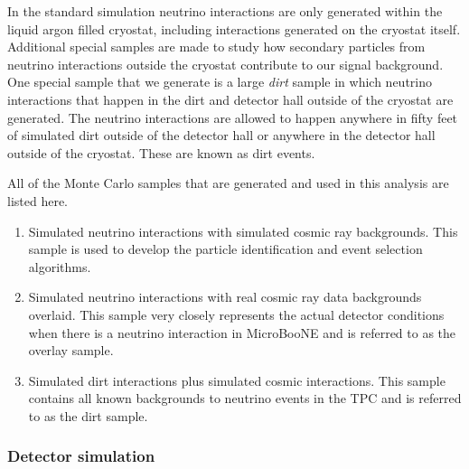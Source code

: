     In the standard simulation neutrino interactions are only generated within
    the liquid argon filled cryostat, including interactions generated on the
    cryostat itself. Additional special samples are made to study how secondary
    particles from neutrino interactions outside the cryostat contribute to our
    signal background. One special sample that we generate is a large
    \textit{dirt} sample in which neutrino interactions that happen in the dirt
    and detector hall outside of the cryostat are generated.  The neutrino
    interactions are allowed to happen anywhere in fifty feet of simulated dirt
    outside of the detector hall or anywhere in the detector hall outside of
    the cryostat. These are known as dirt events.

    All of the Monte Carlo samples that are generated and used in this analysis
    are listed here.
    \begin{enumerate}
      \item Simulated neutrino interactions with simulated cosmic ray
      backgrounds. This sample is used to develop the particle identification
      and event selection algorithms.
      \item Simulated neutrino interactions with real cosmic ray data backgrounds overlaid.
      This sample very closely represents the actual detector conditions when
      there is a neutrino interaction in MicroBooNE and is referred to as the
      overlay sample.
      \item Simulated dirt interactions plus simulated cosmic interactions.
      This sample contains all known backgrounds to neutrino events in the TPC
      and is referred to as the dirt sample.
    \end{enumerate}

  \subsubsection{Detector simulation}\label{sec:detsim}

